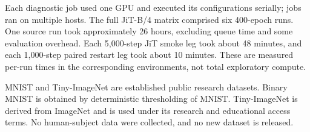 \documentclass{article}
\theoremstyle{plain}
\theoremstyle{definition}
\theoremstyle{remark}
\begin{document}
Each diagnostic job used one GPU and executed its configurations serially; jobs ran on multiple hosts. The full JiT-B/4 matrix comprised six 400-epoch runs. One source run took approximately 26 hours, excluding queue time and some evaluation overhead. Each 5,000-step JiT smoke leg took about 48 minutes, and each 1,000-step paired restart leg took about 10 minutes. These are measured per-run times in the corresponding environments, not total exploratory compute.
\WFclear

MNIST \citep{lecunmnist} and Tiny-ImageNet \citep{le2015tinyimagenet} are established public research datasets. Binary MNIST is obtained by deterministic thresholding of MNIST. Tiny-ImageNet is derived from ImageNet and is used under its research and educational access terms. No human-subject data were collected, and no new dataset is released.
\end{document}
